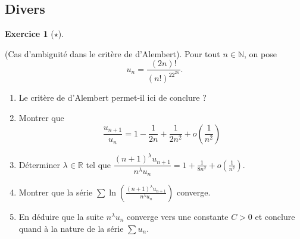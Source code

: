 \documentclass[
  french,
  letterpaper,
  DIV=11,
  numbers=noendperiod]{scrreprt}
\theoremstyle{plain}
\theoremstyle{definition}
\theoremstyle{plain}
\theoremstyle{plain}
\theoremstyle{definition}
\newtheorem{exercise}{Exercice}[chapter]
\theoremstyle{definition}
\theoremstyle{plain}
\theoremstyle{remark}
\begin{document}
\subsection{Divers}\label{divers-1}

\begin{exercise}[\(\star\)]\protect\hypertarget{exr-02-serie-tel}{}\label{exr-02-serie-tel}

(Cas d'ambiguité dans le critère de d'Alembert). Pour tout
\(n\in\mathbb{N}\), on pose \[u_n = \frac{(2n)!}{(n!)^22^{2n}}.\]

\begin{enumerate}
\def\labelenumi{\arabic{enumi}.}
\item
  Le critère de d'Alembert permet-il ici de conclure ?
\item
  Montrer que
  \[\frac{u_{n+1}}{u_n} = 1 - \frac{1}{2n} + \frac{1}{2n^2} + o\left(\frac{1}{n^2}\right)\]
\item
  Déterminer \(\lambda\in\mathbb{R}\) tel que
  \(\dfrac{(n+1)^{\lambda}u_{n+1}}{n^\lambda u_{n}} = 1 + \frac{1}{8n^2} + o\left(\frac{1}{n^2}\right)\).
\item
  Montrer que la série
  \(\displaystyle \sum \ln\left(\frac{(n+1)^{\lambda}u_{n+1}}{n^\lambda u_{n}}\right)\)
  converge.
\item
  En déduire que la suite \(n^\lambda u_n\) converge vers une constante
  \(C>0\) et conclure quand à la nature de la série \(\sum u_n\).
\end{enumerate}

\end{exercise}
\end{document}
